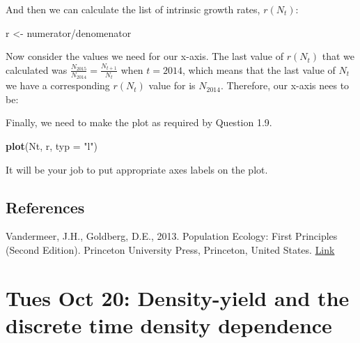 \documentclass[]{book}
\newenvironment{Shaded}{\begin{snugshade}}{\end{snugshade}}
\newcommand{\KeywordTok}[1]{\textcolor[rgb]{0.13,0.29,0.53}{\textbf{{#1}}}}
\newcommand{\DataTypeTok}[1]{\textcolor[rgb]{0.13,0.29,0.53}{{#1}}}
\newcommand{\DecValTok}[1]{\textcolor[rgb]{0.00,0.00,0.81}{{#1}}}
\newcommand{\FloatTok}[1]{\textcolor[rgb]{0.00,0.00,0.81}{{#1}}}
\newcommand{\StringTok}[1]{\textcolor[rgb]{0.31,0.60,0.02}{{#1}}}
\newcommand{\NormalTok}[1]{{#1}}
\begin{document}
And then we can calculate the list of intrinsic growth rates,
\(r(N_t)\):

\begin{Shaded}
\begin{Highlighting}[]
\NormalTok{r <-}\StringTok{ }\NormalTok{numerator/denomenator}
\end{Highlighting}
\end{Shaded}

Now consider the values we need for our x-axis. The last value of
\(r(N_t)\) that we calculated was
\(\frac{N_{2015}}{N_{2014}} = \frac{N_{t+1}}{N_t}\) when \(t=2014\),
which means that the last value of \(N_t\) we have a corresponding
\(r(N_t)\) value for is \(N_{2014}\). Therefore, our x-axis nees to be:

\begin{Shaded}
\end{Shaded}

Finally, we need to make the plot as required by Question 1.9.

\begin{Shaded}
\begin{Highlighting}[]
\KeywordTok{plot}\NormalTok{(Nt, r, }\DataTypeTok{typ =} \StringTok{"l"}\NormalTok{)}
\end{Highlighting}
\end{Shaded}

It will be your job to put appropriate axes labels on the plot.

\section{References}\label{references}

Vandermeer, J.H., Goldberg, D.E., 2013. Population Ecology: First
Principles (Second Edition). Princeton University Press, Princeton,
United States.
\href{https://ebookcentral-proquest-com.qe2a-proxy.mun.ca/lib/mun/detail.action?docID=1205619}{Link}

\chapter{Tues Oct 20: Density-yield and the discrete time density
dependence}\label{tues-oct-20-density-yield-and-the-discrete-time-density-dependence}
\end{document}
